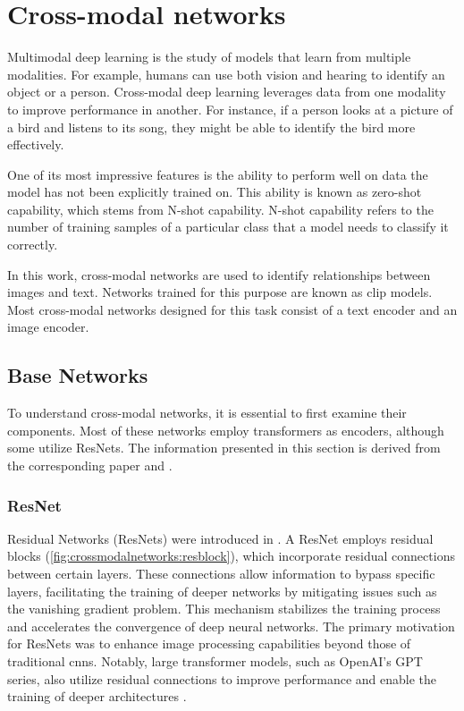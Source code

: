 %
%
%


\chapter{Cross-modal networks
    \label{chapter:crossmodalnetworks}}
    Multimodal deep learning is the study of models that learn from multiple modalities. 
    For example, humans can use both vision and hearing to identify an object or a person. 
    Cross-modal deep learning leverages data from one modality to improve performance in another. 
    For instance, if a person looks at a picture of a bird and listens to its song, they might be able to identify the bird more effectively.

    One of its most impressive features is the ability to perform well on data the model has not been explicitly trained on. 
    This ability is known as zero-shot capability, which stems from N-shot capability. 
    N-shot capability refers to the number of training samples of a particular class that a model needs to classify it correctly.

    In this work, cross-modal networks are used to identify relationships between images and text. 
    Networks trained for this purpose are known as \Acrfull{clip} models. 
    Most cross-modal networks designed for this task consist of a text encoder and an image encoder.

    \section{Base Networks}
    To understand cross-modal networks, it is essential to first examine their components. 
    Most of these networks employ transformers as encoders, although some utilize ResNets. 
    The information presented in this section is derived from the corresponding paper and \cite{clipexplain}.


    
    \subsection{ResNet
    \label{crossmodalnetworks:sec:resnet}}


    Residual Networks (ResNets) were introduced in \cite{resnetpaper}. 
    A ResNet employs residual blocks (\cref{fig:crossmodalnetworks:resblock}), which incorporate residual connections between certain layers. 
    These connections allow information to bypass specific layers, facilitating the training of deeper networks by mitigating issues such as the vanishing gradient problem. 
    This mechanism stabilizes the training process and accelerates the convergence of deep neural networks. 
    The primary motivation for ResNets was to enhance image processing capabilities beyond those of traditional \acrfull{cnn}s. 
    Notably, large transformer models, such as OpenAI's GPT series, also utilize residual connections to improve performance and enable the training of deeper architectures \cite{attentionisallyouneed}.
    
